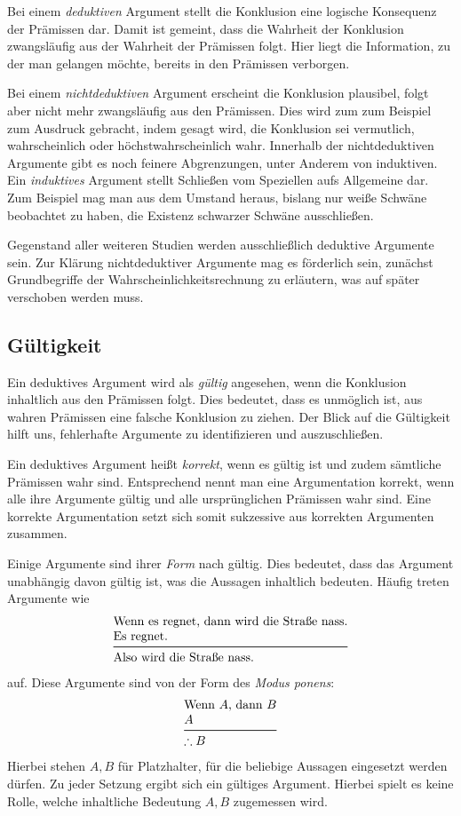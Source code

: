 Bei einem \emph{deduktiven} Argument stellt die Konklusion eine logische
Konsequenz der Prämissen dar. Damit ist gemeint, dass die Wahrheit der
Konklusion zwangsläufig aus der Wahrheit der Prämissen folgt. Hier liegt
die Information, zu der man gelangen möchte, bereits in den Prämissen
verborgen.

Bei einem \emph{nichtdeduktiven} Argument erscheint die Konklusion
plausibel, folgt aber nicht mehr zwangsläufig aus den Prämissen. Dies
wird zum zum Beispiel zum Ausdruck gebracht, indem gesagt wird, die
Konklusion sei vermutlich, wahrscheinlich oder höchstwahrscheinlich wahr.
Innerhalb der nichtdeduktiven Argumente gibt es noch feinere Abgrenzungen,
unter Anderem von induktiven. Ein \emph{induktives} Argument stellt
Schließen vom Speziellen aufs Allgemeine dar. Zum Beispiel mag man
aus dem Umstand heraus, bislang nur weiße Schwäne beobachtet zu haben,
die Existenz schwarzer Schwäne ausschließen.

Gegenstand aller weiteren Studien werden ausschließlich deduktive
Argumente sein. Zur Klärung nichtdeduktiver Argumente mag es förderlich
sein, zunächst Grundbegriffe der Wahrscheinlichkeitsrechnung
zu erläutern, was auf später verschoben werden muss.

\subsection{Gültigkeit}

Ein deduktives Argument wird als \emph{gültig} angesehen, wenn die
Konklusion inhaltlich aus den Prämissen folgt. Dies bedeutet, dass es
unmöglich ist, aus wahren Prämissen eine falsche Konklusion zu ziehen.
Der Blick auf die Gültigkeit hilft uns, fehlerhafte Argumente zu
identifizieren und auszuschließen.

Ein deduktives Argument heißt \emph{korrekt}, wenn es gültig ist und
zudem sämtliche Prämissen wahr sind. Entsprechend nennt man eine
Argumentation korrekt, wenn alle ihre Argumente gültig und alle
ursprünglichen Prämissen wahr sind. Eine korrekte Argumentation setzt
sich somit sukzessive aus korrekten Argumenten zusammen.

Einige Argumente sind ihrer \emph{Form} nach gültig. Dies bedeutet,
dass das Argument unabhängig davon gültig ist, was die Aussagen
inhaltlich bedeuten. Häufig treten Argumente wie
\[\begin{array}{@{}l@{}}
\text{Wenn es regnet, dann wird die Straße nass.}\\
\text{Es regnet.}\\
\midrule[\inferrulewidth]
\text{Also wird die Straße nass.}
\end{array}\]
auf. Diese Argumente sind von der Form des \emph{Modus ponens}:
\[\begin{array}{@{}l@{}}
\text{Wenn $A$, dann $B$}\\
\text{$A$}\\
\midrule[\inferrulewidth]
\therefore\text{$B$}
\end{array}\]
Hierbei stehen $A,B$ für Platzhalter, für die beliebige Aussagen
eingesetzt werden dürfen. Zu jeder Setzung ergibt sich ein gültiges
Argument. Hierbei spielt es keine Rolle, welche inhaltliche Bedeutung
$A,B$ zugemessen wird.

